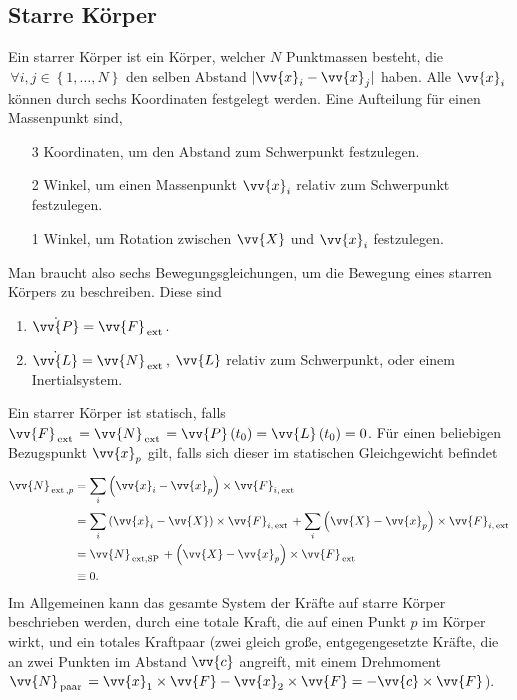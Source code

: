 \documentclass[a4paper,12pt]{article}
\numberwithin{equation}{section}
\begin{document}
\subsection{Starre Körper}
Ein starrer Körper ist ein Körper, welcher $N$ Punktmassen besteht, die $\,\forall i,j \in \left\{1,\hdots ,N\right\}$ den selben Abstand $|\vv{x}_i-\vv{x}_j|$ haben. Alle $\vv{x}_i$ können durch sechs Koordinaten festgelegt werden. Eine Aufteilung für einen Massenpunkt sind,
\begin{enumerate}[label=]
        \item[3] Koordinaten, um den Abstand zum Schwerpunkt festzulegen.
        \item[2] Winkel, um einen Massenpunkt $\vv{x}_i$ relativ zum Schwerpunkt festzulegen.
        \item[1] Winkel, um Rotation zwischen $\vv{X}$ und $\vv{x}_i$ festzulegen.
\end{enumerate}
Man braucht also sechs Bewegungsgleichungen, um die Bewegung eines starren Körpers zu beschreiben. Diese sind
\begin{enumerate}[label=]
        \item $\dot{\vv{P}}=\vv{F}_{\,\text{ext}\,}$.
        \item $\dot{\vv{L}}=\vv{N}_{\,\text{ext}\,}$, $\vv{L}$ relativ zum Schwerpunkt, oder einem Inertialsystem. 
\end{enumerate}
Ein starrer Körper ist statisch, falls $\vv{F}_{\,\text{ext}\,}=\vv{N}_{\,\text{ext}\,}=\vv{P}\left(t_0\right)=\vv{L}\left(t_0\right)=0$. Für einen beliebigen Bezugspunkt $\vv{x}_p$ gilt, falls sich dieser im statischen Gleichgewicht befindet
\begin{align*}
        \vv{N}_{\,\text{ext}\,,p}&=\sum_{i}^{}\left(\vv{x}_i-\vv{x}_p\right)\times \vv{F}_{i,\,\text{ext}\,}\\
                                 &=\sum_{i}^{}\left(\vv{x}_i-\vv{X}\right)\times \vv{F}_{i,\,\text{ext}\,}+\sum_{i}^{}\left(\vv{X}-\vv{x}_p\right)\times \vv{F}_{i,\,\text{ext}\,}\\
                                 &=\vv{N}_{\,\text{ext,SP}\,}+\left(\vv{X}-\vv{x}_p\right)\times \vv{F}_{\,\text{ext}\,}\\
                                 &\equiv 0
.\end{align*}
Im Allgemeinen kann das gesamte System der Kräfte auf starre Körper beschrieben werden, durch eine totale Kraft, die auf einen Punkt $p$ im Körper wirkt, und ein totales Kraftpaar (zwei gleich große, entgegengesetzte Kräfte, die an zwei Punkten im Abstand $\vv{c}$ angreift, mit einem Drehmoment $\vv{N}_{\,\text{paar}\,}=\vv{x}_1\times \vv{F}-\vv{x}_2\times \vv{F}=-\vv{c}\times \vv{F}$).
\end{document}
